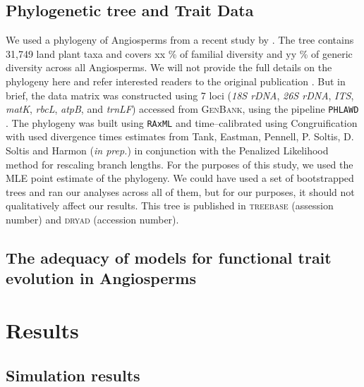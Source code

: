 \documentclass[12pt]{article}
\begin{document}
\subsection*{Phylogenetic tree and Trait Data}
We used a phylogeny of Angiosperms from a recent study by \citet{ZanneBigTree}. The tree contains 31,749 land plant taxa and covers xx \% of familial diversity and yy \% of generic diversity across all Angiosperms. We will not provide the full details on the phylogeny here and refer interested readers to the original publication \citep{ZanneBigTree}. But in brief, the data matrix was constructed using 7 loci (\textit{18S rDNA}, \textit{26S rDNA}, \textit{ITS}, \textit{matK}, \textit{rbcL}, \textit{atpB}, and \textit{trnLF}) accessed from \textsc{GenBank}, using the pipeline \texttt{PHLAWD} \citep{phlawd}. The phylogeny was built using \texttt{RAxML} \citep{raxml} and time--calibrated using Congruification \citep{Eastmancongruify} with used divergence times estimates from Tank, Eastman, Pennell, P. Soltis, D. Soltis and Harmon (\textit{in prep.}) in conjunction with the Penalized Likelihood method \citep{Sanderson1997, treepl} for rescaling branch lengths. For the purposes of this study, we used the MLE point estimate of the phylogeny. We could have used a set of bootstrapped trees and ran our analyses across all of them, but for our purposes, it should not qualitatively affect our results. This tree is published in \textsc{treebase} (assession number) and \textsc{dryad} (accession number).


\subsection*{The adequacy of models for functional trait evolution in Angiosperms}


\section*{Results}

\subsection*{Simulation results}
\end{document}
